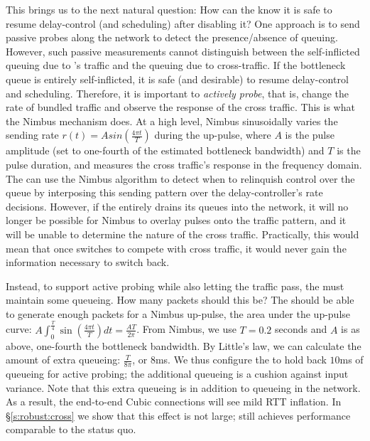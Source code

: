 This brings us to the next natural question: How can the \inbox know it is safe to resume delay-control (and scheduling) after disabling it?
One approach is to send passive probes along the network to detect the presence/absence of queuing. However, such passive measurements cannot distinguish between the self-inflicted queuing due to \name's traffic and the queuing due to cross-traffic. If the bottleneck queue is entirely self-inflicted, it is safe (and desirable) to resume delay-control and scheduling.
Therefore, it is important to \emph{actively probe}, that is, change the rate of bundled traffic and observe the response of the cross traffic. 
This is what the Nimbus mechanism does.
At a high level,
Nimbus sinusoidally varies the sending rate $r(t) = A sin(\frac{4\pi{}t}{T})$ during the up-pulse, where $A$ is the pulse amplitude (set to one-fourth of the estimated bottleneck bandwidth) and $T$ is the pulse duration, and measures the cross traffic's response in the frequency domain.
The \inbox can use the Nimbus algorithm to detect when to relinquish control over the queue by interposing this sending pattern over the delay-controller's rate decisions.
However, if the \inbox entirely drains its queues into the network, it will no longer be possible for Nimbus to overlay pulses onto the traffic pattern, and it will be unable to determine the nature of the cross traffic.
Practically, this would mean that once \inbox switches to compete with cross traffic, it would never gain the information necessary to switch back.

Instead, to support active probing while also letting the traffic pass, the \inbox must maintain some queueing.
How many packets should this be? The \inbox should be able to generate enough packets for a Nimbus up-pulse, \ie the area under the up-pulse curve: 
$A \int_0^{\frac{T}{4}} \sin(\frac{4\pi{}t}{T}) dt = \frac{AT}{2\pi}$.
From Nimbus, we use $T = 0.2$ seconds and $A$ is as above, one-fourth the bottleneck bandwidth. By Little's law, we can calculate the amount of extra queueing: $\frac{T}{8\pi}$, or $8$ms.
We thus configure the \inbox to hold back $10$ms of queueing for active probing; the additional queueing is a cushion against input variance.
Note that this extra queueing is in addition to queueing in the network. As a result, the end-to-end Cubic connections will see mild RTT inflation.
In \S\ref{s:robust:cross} we show that this effect is not large; \name still achieves performance comparable to the status quo.

